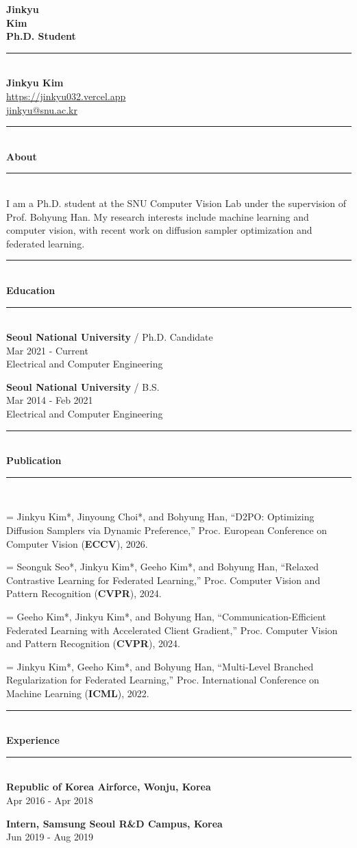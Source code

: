 \documentclass[10pt,letterpaper]{article}
\newlength{\leftcol}
\newlength{\gapcol}
\newlength{\rightcol}
\newlength{\pubhang}
\newcommand{\sectionlabel}[1]{%
  \begin{minipage}[t]{\leftcol}
    \vspace{0pt}
    \rule{0.24in}{0.45pt}\\[0.62em]
    {\fontsize{15}{17}\selectfont\bfseries #1}
  \end{minipage}%
}
\newcommand{\sectionbody}[1]{%
  \hspace{\gapcol}%
  \begin{minipage}[t]{\rightcol}
    \vspace{0pt}
    \rule{\rightcol}{2.7pt}\\[0.74em]
    #1
  \end{minipage}\par
}
\newcommand{\sectionrow}[2]{%
  \sectionlabel{#1}\sectionbody{#2}\vspace{1.08em}
}
\newcommand{\educationitem}[4]{%
  {\fontsize{12.2}{14.2}\selectfont\bfseries #1} / {\fontsize{12.2}{14.2}\selectfont #2}\\[-0.05em]
  {\color{muted}#3}\\[0.42em]
  #4\par
}
\newcounter{pubcount}
\newcommand{\publication}[3]{%
  \stepcounter{pubcount}%
  \par\noindent
  \hangindent=\pubhang\hangafter=1
  \makebox[\pubhang][l]{\thepubcount.}#1, ``#2,'' #3.\par\vspace{0.62em}
}
\newcommand{\experienceitem}[2]{%
  {\fontsize{12.2}{14.2}\selectfont\bfseries #1}\\[-0.05em]
  {\color{muted}#2}\par
}
\begin{document}
\fontsize{10.7}{13.0}\selectfont

\begin{minipage}[t]{\leftcol}
  \vspace{0pt}
  {\fontsize{27}{31}\selectfont\bfseries Jinkyu\\Kim}\\[0.35em]
  {\fontsize{14.3}{17}\selectfont\bfseries\color{accent}Ph.D. Student}
\end{minipage}%
\hspace{\gapcol}%
\begin{minipage}[t]{\rightcol}
  \vspace{0.08in}
  \rule{\rightcol}{2.7pt}\\[0.55em]
  {\fontsize{13.8}{16}\selectfont\bfseries Jinkyu Kim}\\[0.7em]
  {\color{linkblue}\href{https://jinkyu032.vercel.app}{https://jinkyu032.vercel.app}}\\[1.45em]
  \href{mailto:jinkyu@snu.ac.kr}{jinkyu@snu.ac.kr}\\[1.35em]
\end{minipage}\par

\vspace{0.74em}

\sectionrow{About}{%
  \RaggedRight
  I am a Ph.D. student at the SNU Computer Vision Lab under the supervision of Prof. Bohyung Han.
  My research interests include machine learning and computer vision, with recent work on diffusion sampler optimization and federated learning.
}

\sectionrow{Education}{%
  \educationitem{Seoul National University}{Ph.D. Candidate}{Mar 2021 - Current}{Electrical and Computer Engineering}
  \vspace{1.08em}
  \educationitem{Seoul National University}{B.S.}{Mar 2014 - Feb 2021}{Electrical and Computer Engineering}
}

\sectionrow{Publication}{%
  \RaggedRight
  \publication{Jinkyu Kim*, Jinyoung Choi*, and Bohyung Han}{D2PO: Optimizing Diffusion Samplers via Dynamic Preference}{Proc. European Conference on Computer Vision (\textbf{ECCV}), 2026}
  \publication{Seonguk Seo*, Jinkyu Kim*, Geeho Kim*, and Bohyung Han}{Relaxed Contrastive Learning for Federated Learning}{Proc. Computer Vision and Pattern Recognition (\textbf{CVPR}), 2024}
  \publication{Geeho Kim*, Jinkyu Kim*, and Bohyung Han}{Communication-Efficient Federated Learning with Accelerated Client Gradient}{Proc. Computer Vision and Pattern Recognition (\textbf{CVPR}), 2024}
  \publication{Jinkyu Kim*, Geeho Kim*, and Bohyung Han}{Multi-Level Branched \mbox{Regularization} for Federated Learning}{Proc. International Conference on Machine Learning (\textbf{ICML}), 2022}
}

\sectionrow{Experience}{%
  \experienceitem{Republic of Korea Airforce, Wonju, Korea}{Apr 2016 - Apr 2018}
  \vspace{1.08em}
  \experienceitem{Intern, Samsung Seoul R\&D Campus, Korea}{Jun 2019 - Aug 2019}
}
\end{document}
